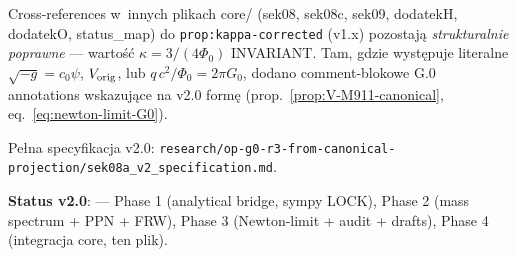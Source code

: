 \begin{remark}%
\label{rem:cross-ref-convention-G0}
Cross-references w~innych plikach core/ (sek08, sek08c, sek09, dodatekH,
dodatekO, status\_map) do \texttt{prop:kappa-corrected} (v1.x) pozostaj\k{a}
\emph{strukturalnie poprawne} --- warto\'s\'c $\kappa = 3/(4\Phi_0)$
INVARIANT. Tam, gdzie wyst\k{e}puje literalne $\sqrt{-g} = c_0\psi$,
$V_{\rm orig}$, lub $q\,c^2/\Phi_0 = 2\pi G_0$, dodano comment-blokowe
G.0 annotations wskazuj\k{a}ce na v2.0 form\k{e}
(prop.~\ref{prop:V-M911-canonical}, eq.~\eqref{eq:newton-limit-G0}).

Pe\l{}na specyfikacja v2.0:
\texttt{research/op-g0-r3-from-canonical-projection/sek08a\_v2\_specification.md}.

\textbf{Status v2.0}: 
--- Phase 1 (analytical bridge, sympy LOCK), Phase 2 (mass spectrum +
PPN + FRW), Phase 3 (Newton-limit + audit + drafts), Phase 4
(integracja core, ten plik).
\end{remark}
